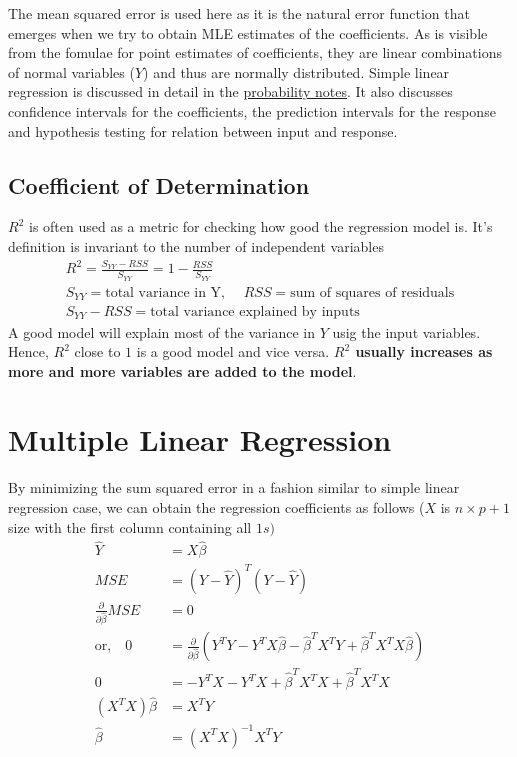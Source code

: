 \documentclass[../statistical_learning_notes.tex]{subfiles}
\begin{document}
The mean squared error is used here as it is the natural error function that emerges when we try to obtain MLE estimates of the coefficients. As is visible from the fomulae for point estimates of coefficients, they are linear combinations of normal variables ($Y$) and thus are normally distributed.\newline
Simple linear regression is discussed in detail in the \href{https://github.com/DragonWarrior15/statistical-learning-notes/blob/master/tex_files/probability/probability-notes.pdf}{probability notes}. It also discusses confidence intervals for the coefficients, the prediction intervals for the response and hypothesis testing for relation between input and response.\newline


\subsection{Coefficient of Determination}
$R^{2}$ is often used as a metric for checking how good the regression model is. It's definition is invariant to the number of independent variables
\begin{gather*}
    R^{2} = \frac{S_{YY} - RSS}{S_{YY}} = 1 - \frac{RSS}{S_{YY}}\\
    S_{YY} = \text{total variance in Y, }\quad RSS = \text{sum of squares of residuals}\\
    S_{YY} - RSS = \text{total variance explained by inputs}
\end{gather*}
A good model will explain most of the variance in $Y$ usig the input variables. Hence, $R^{2}$ close to $1$ is a good model and vice versa. \textbf{$R^{2}$ usually increases as more and more variables are added to the model}.


\section{Multiple Linear Regression}
By minimizing the sum squared error in a fashion similar to simple linear regression case, we can obtain the regression coefficients as follows ($X$ is $n \times p+1$ size with the first column containing all $1s)$
\begin{align*}
    \hat{Y} &= X\hat{\beta}\\
    MSE &= (Y-\hat{Y})^{T}(Y-\hat{Y})\\
    \frac{\partial}{\partial \hat{\beta}} MSE &= 0 \\
    \text{or,} \quad 0 &= \frac{\partial}{\partial \hat{\beta}} (Y^{T}Y - Y^{T}X\hat{\beta} - \hat{\beta}^{T}X^{T}Y + \hat{\beta}^{T}X^{T}X\hat{\beta})\\
    0 &= -Y^{T}X - Y^{T}X + \hat{\beta}^{T}X^{T}X + \hat{\beta}^{T}X^{T}X\\
    (X^{T}X)\hat{\beta} &= X^{T}Y\\
    \hat{\beta} &= (X^{T}X)^{-1}X^{T}Y \tag{\theequation}\label{eq:linear_reg_solution}
\end{align*}
\end{document}
